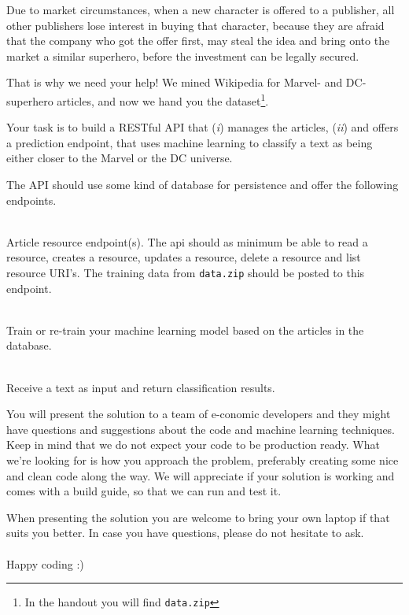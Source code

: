 \documentclass{article}
\begin{document}
    Due to market circumstances, when a new character is offered to a
    publisher, all other publishers lose interest in buying that character,
    because they are afraid that the company who got the offer first, may
    steal the idea and bring onto the market a similar superhero, before the
    investment can be legally secured.

    That is why we need your help! We mined Wikipedia for Marvel- and
    DC-superhero articles, and now we hand you the dataset\footnote{In the
    handout you will find \texttt{data.zip}}.

    Your task is to build a RESTful API that (\textit{i}) manages the
    articles, (\textit{ii}) and offers a prediction endpoint, that uses
    machine learning to classify a text as being either closer to the Marvel
    or the DC universe.

    \clearpage
    The API should use some kind of database for persistence and offer the
    following endpoints.
    \vspace{0.5cm}
    \begin{description}[labelindent=0.5cm, leftmargin=1cm]
        \item[\texttt{/article/(\$id)}] \hfill \\ 
            Article resource endpoint(s). The api should as minimum be able
            to read a resource, creates a resource, updates a resource,
            delete a resource and list resource URI's. The training data from
            \texttt{data.zip} should be posted to this endpoint.
        \item[\texttt{/train}] \hfill \\
            Train or re-train your machine learning model based on the
            articles in the database.
        \item[\texttt{/predict}] \hfill \\ 
            Receive a text as input and return classification results.
    \end{description} 
    \vspace{0.5cm}
    \noindent You will present the solution to a team of e-conomic developers
    and they might have questions and suggestions about the code and machine
    learning techniques. Keep in mind that we do not expect your code to be
    production ready. What we're looking for is how you approach the problem,
    preferably creating some nice and clean code along the way. We will
    appreciate if your solution is working and comes with a build guide, so
    that we can run and test it.

    When presenting the solution you are welcome to bring your own laptop if
    that suits you better. In case you have questions, please do not hesitate
    to ask.
    \\\\
    Happy coding :)
\end{document}
